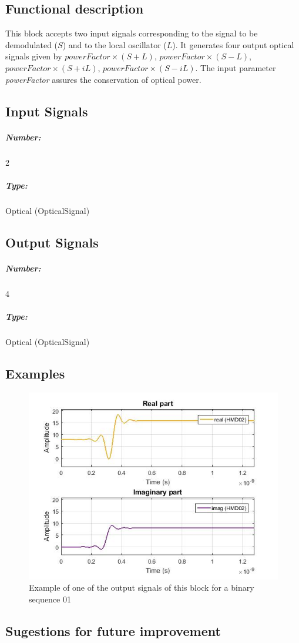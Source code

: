 \subsection*{Functional description}

This block accepts two  input signals corresponding to the signal to be demodulated ($S$) and to the local oscillator ($L$). It generates four output optical signals given by $\textit{powerFactor}\times(S+L)$, $\textit{powerFactor}\times(S-L)$,$\textit{powerFactor}\times(S+iL)$, $\textit{powerFactor}\times(S-iL)$. The input parameter \textit{powerFactor} assures the conservation of optical power.

\pagebreak

\subsection*{Input Signals}

\subparagraph*{Number:} 2

\subparagraph*{Type:} Optical (OpticalSignal)

\subsection*{Output Signals}

\subparagraph*{Number:} 4

\subparagraph*{Type:} Optical (OpticalSignal)

\subsection*{Examples} 

\begin{figure}[h]
	\centering
	\includegraphics[width=\textwidth]{../homodyne_receiver/figures/OpticalHybrid_output}
	\caption{Example of one of the output signals of this block for a binary sequence 01}\label{OpticalHybrid_output}
\end{figure}

\subsection*{Sugestions for future improvement}
